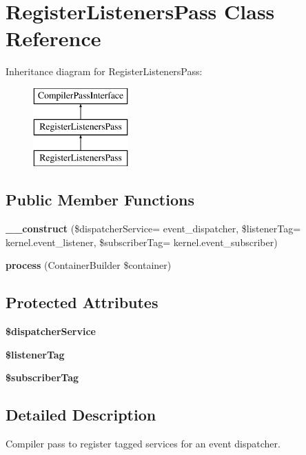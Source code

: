 \section{Register\+Listeners\+Pass Class Reference}
\label{class_symfony_1_1_component_1_1_event_dispatcher_1_1_dependency_injection_1_1_register_listeners_pass}
Inheritance diagram for Register\+Listeners\+Pass\+:\begin{figure}[H]
\begin{center}
\leavevmode
\includegraphics[height=3.000000cm]{class_symfony_1_1_component_1_1_event_dispatcher_1_1_dependency_injection_1_1_register_listeners_pass}
\end{center}
\end{figure}
\subsection*{Public Member Functions}
\begin{DoxyCompactItemize}
\item 
{\bf \+\_\+\+\_\+construct} (\$dispatcher\+Service= \textquotesingle{}event\+\_\+dispatcher\textquotesingle{}, \$listener\+Tag= \textquotesingle{}kernel.\+event\+\_\+listener\textquotesingle{}, \$subscriber\+Tag= \textquotesingle{}kernel.\+event\+\_\+subscriber\textquotesingle{})
\item 
{\bf process} (Container\+Builder \$container)
\end{DoxyCompactItemize}
\subsection*{Protected Attributes}
\begin{DoxyCompactItemize}
\item 
{\bf \$dispatcher\+Service}
\item 
{\bf \$listener\+Tag}
\item 
{\bf \$subscriber\+Tag}
\end{DoxyCompactItemize}


\subsection{Detailed Description}
Compiler pass to register tagged services for an event dispatcher. 


